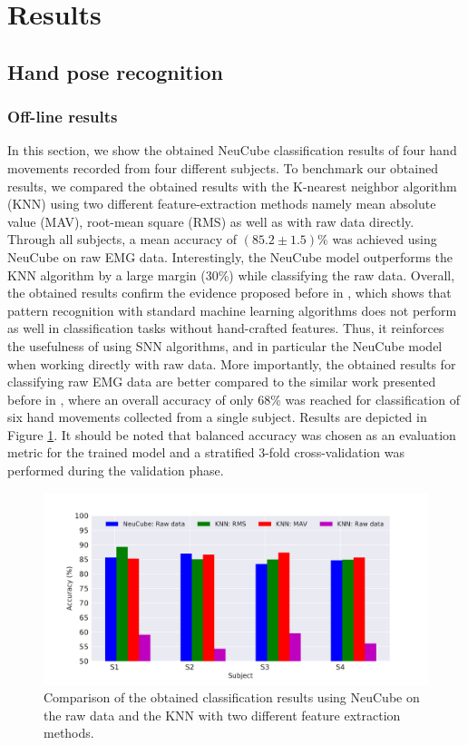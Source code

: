 \documentclass[journal,article,submit,moreauthors,pdftex,10pt,a4paper]{Definitions/mdpi}
\begin{document}
\section{Results}
\subsection{Hand pose recognition}
\subsubsection{Off-line results}
In this section, we show the obtained NeuCube classification results of four hand movements recorded from four different subjects. To benchmark our obtained results, we compared the obtained results with the K-nearest neighbor algorithm (KNN) using two different feature-extraction methods namely mean absolute value (MAV), root-mean square (RMS) as well as with raw data directly. Through all subjects, a mean accuracy of  $(85.2\pm 1.5)\%$ was achieved using NeuCube on raw EMG data. Interestingly, the NeuCube model outperforms the KNN algorithm by a large margin (30\%) while classifying the raw data. Overall, the obtained results confirm the evidence proposed before in \cite{9}, which shows that pattern recognition with standard machine learning algorithms does not perform as well in classification tasks without hand-crafted features. Thus, it reinforces the usefulness of using SNN algorithms, and in particular the NeuCube model when working directly with raw data. More importantly, the obtained results for classifying raw EMG data are better compared to the similar work presented before in \cite{9}, where an overall accuracy of only 68\% was reached for classification of six hand movements collected from a single subject. Results are depicted in Figure \ref{FIG:x.pdf}. It should be noted that balanced accuracy was chosen as an evaluation metric for the trained model and a stratified 3-fold cross-validation was performed during the validation phase. 
\begin{figure}[H]
    \centering
    \includegraphics [width=0.85\linewidth]{x.pdf}
    \caption{Comparison of the obtained classification results using NeuCube on the raw data and the KNN with two different feature extraction methods.  
}
    \label{FIG:x.pdf}
\end{figure}
\end{document}
